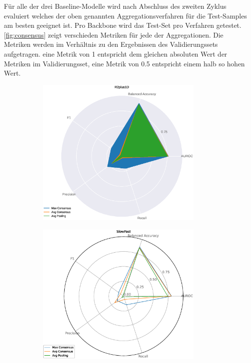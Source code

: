 Für alle der drei Baseline-Modelle wird nach Abschluss des zweiten Zyklus evaluiert welches der oben genannten Aggregationsverfahren für die Test-Samples am besten geeignet ist.
Pro Backbone wird das Test-Set pro Verfahren getestet.
\autoref{fig:consensus} zeigt verschieden Metriken für jede der Aggregationen.
Die Metriken werden im Verhältnis zu den Ergebnissen des Validierungssets aufgetragen.
\Dh eine Metrik von 1 entspricht dem gleichen absoluten Wert der Metriken im Validierungsset, eine Metrik von 0.5 entspricht einem halb so hohen Wert.

\begin{figure}[htbp!]
    \centering
    \begin{subfigure}{.33\textwidth}
        \centering
        \includegraphics[width=0.9\textwidth, keepaspectratio, interpolate]{img/07_consensus_R2plus1D.eps}
    \end{subfigure}%
    \begin{subfigure}{.33\textwidth}
        \centering
        \includegraphics[width=0.9\textwidth, keepaspectratio, interpolate]{img/07_consensus_SlowFast.eps}

\end{subfigure}
\end{figure}
